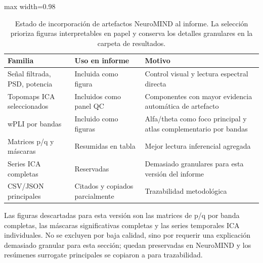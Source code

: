 \begin{table}[H]
\centering
\small
\caption{Estado de incorporación de artefactos NeuroMIND al informe. La selección prioriza figuras interpretables en papel y conserva los detalles granulares en la carpeta de resultados.}
\label{tab:results-artifact-selection}
\begin{adjustbox}{max width=0.98\textwidth}
\begin{tabular}{@{}p{}p{}p{}@{}}
\toprule
\textbf{Familia} & \textbf{Uso en informe} & \textbf{Motivo} \\
\midrule
Señal filtrada, PSD, potencia & Incluida como figura & Control visual y lectura espectral directa \\
Topomaps ICA seleccionados & Incluidos como panel QC & Componentes con mayor evidencia automática de artefacto \\
wPLI por bandas & Incluido como figuras & Alfa/theta como foco principal y atlas complementario por bandas \\
Matrices p/q y máscaras & Resumidas en tabla & Mejor lectura inferencial agregada \\
Series ICA completas & Reservadas & Demasiado granulares para esta versión del informe \\
CSV/JSON principales & Citados y copiados parcialmente & Trazabilidad metodológica \\
\bottomrule
\end{tabular}
\end{adjustbox}
\end{table}

Las figuras descartadas para esta versión son las matrices de p/q por banda completas, las máscaras significativas completas y las series temporales ICA individuales. No se excluyen por baja calidad, sino por requerir una explicación demasiado granular para esta sección; quedan preservadas en NeuroMIND y los resúmenes surrogate principales se copiaron a  para trazabilidad.
